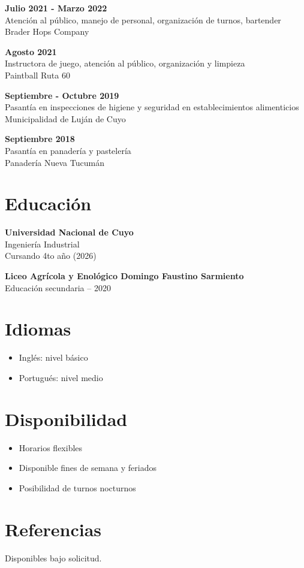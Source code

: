 \documentclass[11pt,a4paper]{article}
\begin{document}
\vspace{5pt}

\textbf{Julio 2021 - Marzo 2022} \\
Atención al público, manejo de personal, organización de turnos, bartender \\
Brader Hops Company

\vspace{5pt}

\textbf{Agosto 2021} \\
Instructora de juego, atención al público, organización y limpieza \\
Paintball Ruta 60

\vspace{5pt}

\textbf{Septiembre - Octubre 2019} \\
Pasantía en inspecciones de higiene y seguridad en establecimientos alimenticios \\
Municipalidad de Luján de Cuyo

\vspace{5pt}

\textbf{Septiembre 2018} \\
Pasantía en panadería y pastelería \\
Panadería Nueva Tucumán

\section*{Educación}

\textbf{Universidad Nacional de Cuyo} \\
Ingeniería Industrial \\
Cursando 4to año (2026)

\vspace{5pt}

\textbf{Liceo Agrícola y Enológico Domingo Faustino Sarmiento} \\
Educación secundaria – 2020

\section*{Idiomas}
\begin{itemize}
    \item Inglés: nivel básico
    \item Portugués: nivel medio
\end{itemize}

\section*{Disponibilidad}
\begin{itemize}
    \item Horarios flexibles
    \item Disponible fines de semana y feriados
    \item Posibilidad de turnos nocturnos
\end{itemize}

\section*{Referencias}
Disponibles bajo solicitud.
\end{document}
